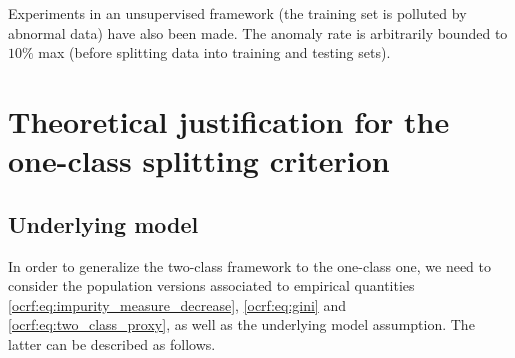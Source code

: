 Experiments in an unsupervised framework (the training set is polluted by
abnormal data) have also been made. %
The anomaly rate is arbitrarily bounded to $10\%$ max (before splitting data into training and testing sets).


\section{Theoretical justification for the one-class splitting criterion}
\label{sec:ocrf:theory}
\subsection{Underlying model}
\label{ocrf:sec:model}
In order to generalize the two-class framework to the one-class one, we need to consider the population versions associated to empirical quantities \eqref{ocrf:eq:impurity_measure_decrease}, \eqref{ocrf:eq:gini} and \eqref{ocrf:eq:two_class_proxy}, as well as the underlying model assumption. The latter can be described as follows.

